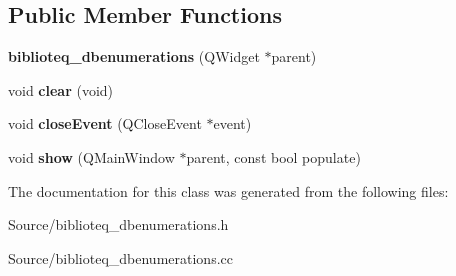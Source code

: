\subsection*{Public Member Functions}
\begin{DoxyCompactItemize}
\item 
{\bfseries biblioteq\+\_\+dbenumerations} (Q\+Widget $\ast$parent)\hypertarget{classbiblioteq__dbenumerations_a7778f7dd99ba937b204f3ca6192bbe8e}{}\label{classbiblioteq__dbenumerations_a7778f7dd99ba937b204f3ca6192bbe8e}

\item 
void {\bfseries clear} (void)\hypertarget{classbiblioteq__dbenumerations_adccbde7a487bde517dca606889c2ec9a}{}\label{classbiblioteq__dbenumerations_adccbde7a487bde517dca606889c2ec9a}

\item 
void {\bfseries close\+Event} (Q\+Close\+Event $\ast$event)\hypertarget{classbiblioteq__dbenumerations_a39f3fd8a8b6244ed9598e47480a8b602}{}\label{classbiblioteq__dbenumerations_a39f3fd8a8b6244ed9598e47480a8b602}

\item 
void {\bfseries show} (Q\+Main\+Window $\ast$parent, const bool populate)\hypertarget{classbiblioteq__dbenumerations_a5c85f59659f447f0d921d3e8b6d461f8}{}\label{classbiblioteq__dbenumerations_a5c85f59659f447f0d921d3e8b6d461f8}

\end{DoxyCompactItemize}


The documentation for this class was generated from the following files\+:\begin{DoxyCompactItemize}
\item 
Source/biblioteq\+\_\+dbenumerations.\+h\item 
Source/biblioteq\+\_\+dbenumerations.\+cc\end{DoxyCompactItemize}
